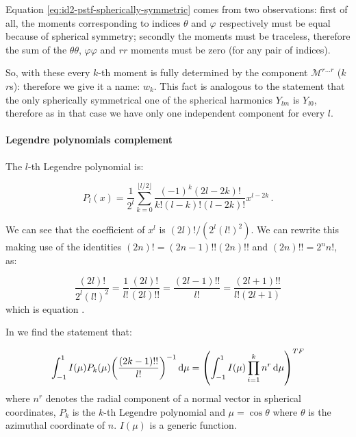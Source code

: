 \documentclass[main.tex]{subfiles}
\begin{document}
Equation \eqref{eq:id2-pstf-spherically-symmetric} comes from two observations:
first of all, the moments corresponding to indices \(\theta\) and \(\varphi\) respectively must be equal because of spherical symmetry; secondly the moments must be traceless, therefore the sum of the \(\theta \theta\), \(\varphi \varphi\) and \(rr\) moments must be zero (for any pair of indices).

So, with these every \(k\)-th moment is fully determined by the component \(\mathscr M ^{r\dots r}\) (\(k\) \(r\)s): therefore we give it a name: \(w_k\).
This fact is analogous to the statement that the only spherically symmetrical one of the spherical harmonics \(Y_{lm}\) is \(Y_{l0}\), therefore as in that case we have only one independent component for every \(l\).

\paragraph{Legendre polynomials complement}

The \(l\)-th Legendre polynomial is:

\begin{equation} \label{eq:legendre-polynomials}
    P_{l}(x)=\frac{1}{2^{l}} \sum_{k=0}^{\lfloor l / 2\rfloor} \frac{(-1)^{k}(2 l-2 k) !}{k !(l-k) !(l-2 k) !} x^{l-2 k} \,.
\end{equation}

We can see that the coefficient of \(x^l\) is \((2l)! / (2^l (l!)^2)\). We can rewrite this making use of the identities \((2n)! = (2n-1)!! (2n)!!\) and \((2n)!! = 2^n n!\),  as:

\begin{equation}
    \frac{(2l)!}{2^l (l!)^2} = \frac{1}{l!} \frac{(2l)!}{(2l)!!} = \frac{(2l-1)!!}{l!} = \frac{(2l+1)!!}{l! (2l+1)}
\end{equation}
which is equation \cite[eq. 5.7d]{Thorne:1981feb}.

In \textcite[eqs. 5.6]{Thorne:1981feb} we find the statement that:

\begin{equation} \label{eq:thorne-trace-free-integral-claim}
    \int_{-1}^1 I(\mu) P_k(\mu) \qty(\frac{(2k-1)!!}{l!})^{-1} \dd{\mu} = \qty(\int_{-1}^1  I(\mu) \prod_{i=1}^k n^r \dd{\mu})^{TF}
\end{equation}
where \(n^r\) denotes the radial component of a normal vector in spherical coordinates, \(P_k\) is the \(k\)-th Legendre polynomial and \(\mu = \cos \theta\) where \(\theta\) is the azimuthal coordinate of \(n\). \(I(\mu)\) is a generic function.
\end{document}
